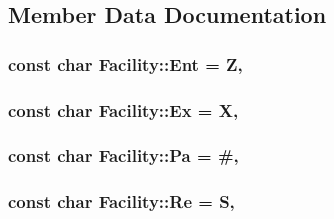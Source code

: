 \subsection{Member Data Documentation}
\subsubsection[{\texorpdfstring{Ent}{Ent}}]{\setlength{\rightskip}{0pt plus 5cm}const char Facility\+::\+Ent = \textquotesingle{}Z\textquotesingle{}\hspace{0.3cm}{\ttfamily [static]}, {\ttfamily [protected]}}\hypertarget{classFacility_a2946221d924add37fc2a4aab5912dc60}{}\label{classFacility_a2946221d924add37fc2a4aab5912dc60}
\subsubsection[{\texorpdfstring{Ex}{Ex}}]{\setlength{\rightskip}{0pt plus 5cm}const char Facility\+::\+Ex = \textquotesingle{}X\textquotesingle{}\hspace{0.3cm}{\ttfamily [static]}, {\ttfamily [protected]}}\hypertarget{classFacility_ad30246918df96bd5a4e63063a1a1ae2e}{}\label{classFacility_ad30246918df96bd5a4e63063a1a1ae2e}
\subsubsection[{\texorpdfstring{Pa}{Pa}}]{\setlength{\rightskip}{0pt plus 5cm}const char Facility\+::\+Pa = \textquotesingle{}\#\textquotesingle{}\hspace{0.3cm}{\ttfamily [static]}, {\ttfamily [protected]}}\hypertarget{classFacility_a5588f173a18205498f4c3bfd3c04d28c}{}\label{classFacility_a5588f173a18205498f4c3bfd3c04d28c}
\subsubsection[{\texorpdfstring{Re}{Re}}]{\setlength{\rightskip}{0pt plus 5cm}const char Facility\+::\+Re = \textquotesingle{}S\textquotesingle{}\hspace{0.3cm}{\ttfamily [static]}, {\ttfamily [protected]}}\hypertarget{classFacility_a0c187566e945c796ffb5679d6c34287b}{}\label{classFacility_a0c187566e945c796ffb5679d6c34287b}
